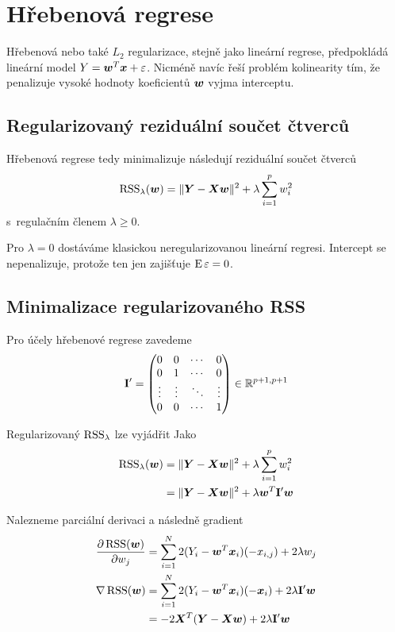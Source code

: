 \section{Hřebenová regrese} \label{sec:ridge}

Hřebenová nebo také $L_2$ regularizace, stejně jako lineární regrese, předpokládá lineární model $Y = \bm{w}^T \bm{x} + \varepsilon$. Nicméně navíc řeší problém kolinearity tím, že penalizuje vysoké hodnoty koeficientů $\bm{w}$ vyjma interceptu.

\subsection{Regularizovaný reziduální součet čtverců}

Hřebenová regrese tedy minimalizuje následují reziduální součet čtverců
\[ \operatorname{RSS}_\lambda(\bm{w}) = \| \bm{Y} - \bm{X} \bm{w} \|^2 + \lambda \sum_{i=1}^{p} w_i^2 \]
s~regulačním členem $\lambda \ge 0$.

Pro $\lambda = 0$ dostáváme klasickou neregularizovanou lineární regresi. Intercept se nepenalizuje, protože ten jen zajišťuje $\operatorname{E} \varepsilon = 0$.

\subsection{Minimalizace regularizovaného RSS}

Pro účely hřebenové regrese zavedeme
\[\mathbf{}
    \mathbf{I}' =
    \begin{pmatrix}
        0      & 0      & \cdots & 0      \\
        0      & 1      & \cdots & 0      \\
        \vdots & \vdots & \ddots & \vdots \\
        0      & 0      & \cdots & 1
    \end{pmatrix}
    \in \mathbb{R}^{p+1, p+1}
\]

Regularizovaný $\operatorname{RSS}_\lambda$ lze vyjádřit Jako
\begin{align*}
    \operatorname{RSS}_\lambda(\bm{w})
     & = \| \bm{Y} - \bm{X} \bm{w} \|^2 + \lambda \sum_{i=1}^{p} w_i^2  \\
     & = \| \bm{Y} - \bm{X} \bm{w} \|^2 + \lambda \bm{w}^T \mathbf{I}' \bm{w}
\end{align*}

Nalezneme parciální derivaci a následně gradient
\begin{align*}
    \pdv{\operatorname{RSS}(\bm{w})}{w_j}
     & = \sum_{i=1}^{N} 2 (Y_i - \bm{w}^T \bm{x}_i) (-x_{i, j}) + 2 \lambda w_j         \\
    \nabla \operatorname{RSS}(\bm{w})
     & = \sum_{i=1}^{N} 2 (Y_i - \bm{w}^T \bm{x}_i) (-\bm{x}_i) + 2 \lambda \mathbf{I}' \bm{w} \\
     & = -2 \bm{X}^T (\bm{Y} - \bm{X}\bm{w}) + 2 \lambda \mathbf{I}' \bm{w}
\end{align*}

